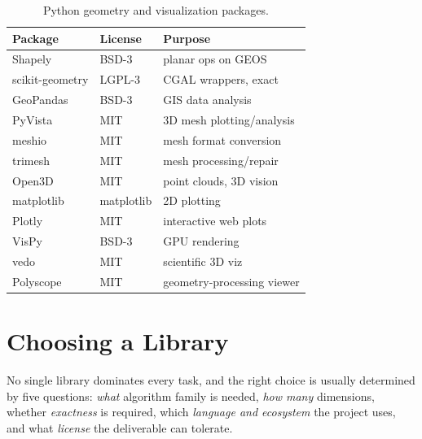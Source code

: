 \begin{table}[ht]
\centering
\begin{tabular}{lll}
\hline
\textbf{Package} & \textbf{License} & \textbf{Purpose} \\
\hline
Shapely          & BSD-3 & planar ops on GEOS \\
scikit-geometry  & LGPL-3 & CGAL wrappers, exact \\
GeoPandas        & BSD-3 & GIS data analysis \\
PyVista          & MIT   & 3D mesh plotting/analysis \\
meshio           & MIT   & mesh format conversion \\
trimesh          & MIT   & mesh processing/repair \\
Open3D           & MIT   & point clouds, 3D vision \\
matplotlib       & matplotlib & 2D plotting \\
Plotly           & MIT   & interactive web plots \\
VisPy            & BSD-3 & GPU rendering \\
vedo             & MIT   & scientific 3D viz \\
Polyscope        & MIT   & geometry-processing viewer \\
\hline
\end{tabular}
\caption{Python geometry and visualization packages.}
\label{tbl:appsoft_python}
\end{table}

\section{Choosing a Library}
\label{sec:app_soft_choosing}

No single library dominates every task, and the right choice is usually
determined by five questions: \emph{what} algorithm family is needed,
\emph{how many} dimensions, whether \emph{exactness} is required,
which \emph{language and ecosystem} the project uses, and what
\emph{license} the deliverable can tolerate.

